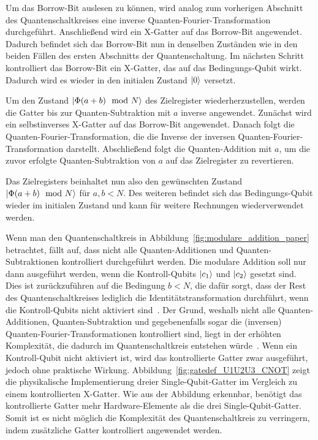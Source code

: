 Um das Borrow-Bit auslesen zu können, 
wird analog zum vorherigen Abschnitt des Quantenschaltkreises eine inverse Quanten-Fourier-Transformation durchgeführt.
Anschließend wird ein X-Gatter auf das Borrow-Bit angewendet.
Dadurch befindet sich das Borrow-Bit nun in denselben Zuständen wie in den beiden Fällen des ersten Abschnitts der Quantenschaltung.
Im nächsten Schritt kontrolliert das Borrow-Bit ein X-Gatter, das auf das Bedingungs-Qubit wirkt.
Dadurch wird es wieder in den initialen Zustand \(\ket{0}\) versetzt.

Um den Zustand \(\ket{\Phi(a+b)\mod N}\) des Zielregister wiederherzustellen, 
werden die Gatter bis zur Quanten-Subtraktion mit \(a\) inverse angewendet.
Zunächst wird ein selbstinverses X-Gatter auf das Borrow-Bit angewendet.
Danach folgt die Quanten-Fourier-Transformation, 
die die Inverse der inversen Quanten-Fourier-Transformation darstellt.
Abschließend folgt die Quanten-Addition mit \(a\), 
um die zuvor erfolgte Quanten-Subtraktion von \(a\) auf das Zielregister zu revertieren.

Das Zielregisters beinhaltet nun also den gewünschten Zustand \(\ket{\Phi(a+b)\mod N}\) für \(a, b < N\).
Des weiteren befindet sich das Bedingungs-Qubit wieder im initialen Zustand und kann für weitere Rechnungen wiederverwendet werden.

\vspace{1em}

Wenn man den Quantenschaltkreis in Abbildung~\ref{fig:modulare_addition_paper} betrachtet,
fällt auf, 
dass nicht alle Quanten-Additionen und Quanten-Subtraktionen kontrolliert durchgeführt werden.
Die modulare Addition soll nur dann ausgeführt werden, wenn die Kontroll-Qubits \(\ket{c_1}\) und \(\ket{c_2}\) gesetzt sind.
Dies ist zurückzuführen auf die Bedingung \(b < N\), 
die dafür sorgt, dass der Rest des Quantenschaltkreises lediglich die Identitätstransformation durchführt, 
wenn die Kontroll-Qubits nicht aktiviert sind~\cite{beauregard2003circuit}.
Der Grund, weshalb nicht alle Quanten-Additionen, 
Quanten-Subtraktion und gegebenenfalls sogar die (inversen) Quanten-Fourier-Transformationen kontrolliert sind,
liegt in der erhöhten Komplexität, die dadurch im Quantenschaltkreis entstehen würde~\cite{beauregard2003circuit}.
Wenn ein Kontroll-Qubit nicht aktiviert ist, wird das kontrollierte Gatter zwar ausgeführt, jedoch ohne praktische Wirkung.
Abbildung~\ref{fig:gatedef_U1U2U3_CNOT} zeigt die physikalische Implementierung dreier Single-Qubit-Gatter im Vergleich zu einem kontrollierten X-Gatter.
Wie aus der Abbildung erkennbar, 
benötigt das kontrollierte Gatter mehr Hardware-Elemente als die drei Single-Qubit-Gatter.
Somit ist es nicht möglich die Komplexität des Quantenschaltkreis zu verringern, 
indem zusätzliche Gatter kontrolliert angewendet werden.

